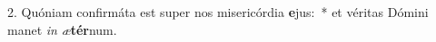 2. Quóniam confirmáta est super nos misericórdia \textbf{e}jus:~*  et véritas Dómini manet \textit{in} \textit{æ}\textbf{tér}num.\

